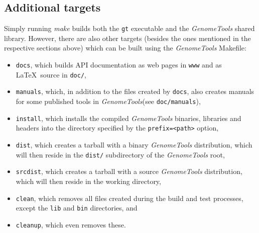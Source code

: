 \documentclass[11pt,final]{article}
\newcommand{\keyword}[1]{\lstinline{#1}}
\newcommand{\Gt}[0]{\emph{GenomeTools}\xspace}
\begin{document}
\subsection{Additional targets}
Simply running \emph{make} builds both the \keyword{gt} executable and the
\Gt shared library. However, there are also other targets (besides the ones
mentioned in the respective sections above) which can be built using the \Gt
Makefile:
\begin{itemize}
\item
\keyword{docs}, which builds API documentation as web pages in \keyword{www} and
as \LaTeX\ source in \keyword{doc/},
\item
\keyword{manuals}, which, in addition to the files created by \keyword{docs},
also creates manuals for some published tools in \Gt (see
\keyword{doc/manuals}),
\item
\keyword{install}, which installs the compiled \Gt binaries, libraries and
headers into the directory specified by the \keyword{prefix=<path>} option,
\item
\keyword{dist}, which creates a tarball with a binary \Gt distribution, which will
then reside in the \keyword{dist/} subdirectory of the \Gt root,
\item
\keyword{srcdist}, which creates a tarball with a source \Gt distribution, which will
then reside in the working directory,
\item
\keyword{clean}, which removes all files created during the build and test
processes, except the \keyword{lib} and \keyword{bin} directories, and
\item
\keyword{cleanup}, which even removes these.
\end{itemize}
\end{document}
